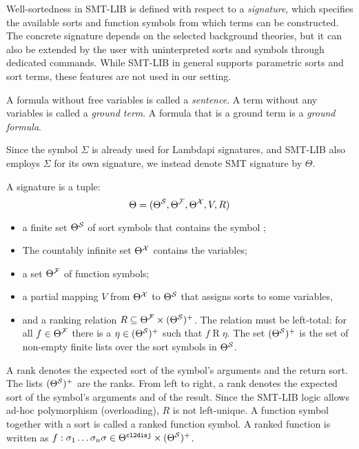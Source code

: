 Well-sortedness in SMT-LIB is defined with respect to a \emph{signature}, which specifies the available sorts and function symbols from which terms can be constructed.
The concrete signature depends on the selected background theories, but it can also be extended by the user with uninterpreted sorts and symbols through dedicated commands.
While SMT-LIB in general supports parametric sorts and sort terms, these features are not used in our setting.


A formula without free variables is called a \emph{sentence}.
A term without any variables is called a \emph{ground term}. A formula that is a ground term is a \emph{ground formula}.

\begin{notation}
Since the symbol $\Sigma$ is already used for Lambdapi signatures, and SMT-LIB also employs $\Sigma$ for its own signature, we instead denote SMT signature by $\Theta$.  
\end{notation}

\begin{definition}[Signature]\label{def:smt-signature}
A signature is a tuple:
\[
    \Theta = (\Theta^\cal{S}, \Theta^\cal{F}, \Theta^\cal{X}, V, R)
\]
\begin{itemize}
    \item  a finite set $\Theta^\cal{S}$  of sort symbols that contains the symbol ;
    \item The countably infinite set $\Theta^\cal{X}$ contains the variables;
    \item a set $\Theta^\cal{F}$ of function symbols;
    \item a partial mapping $V$ from $\Theta^\cal{X}$ to $\Theta^\cal{S}$ that assigns sorts to some variables,
    \item and a ranking relation $R \subseteq \Theta^\cal{F} \times (\Theta^\cal{S})^+$. The relation must be left-total: for
    all $f \in \Theta^\cal{F}$ there is a $\eta \in (\Theta^\cal{S})^+$ such that $f \mathrel{R} \eta$. The set $(\Theta^\cal{S})^+$ 
    is the set of non-empty finite lists over the sort symbols in $\Theta^\cal{S}$.
\end{itemize}
\end{definition}

A rank denotes the expected sort of the symbol's arguments and the return sort. The lists $(\Theta^\cal{S})^+$ are the ranks.
From left to right, a rank denotes the expected sort of the symbol's arguments and of the result.
Since the SMT-LIB logic allows ad-hoc polymorphism (overloading), $R$ is not left-unique.
A function symbol together with a sort is called a ranked function symbol.
A ranked function is written as $f: \sigma_1\dots\sigma_n\sigma \in \Theta^{\cltodisj} \times (\Theta^{\cal{S}})^+$.

